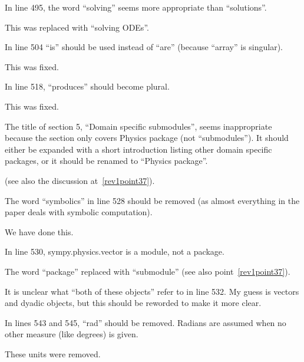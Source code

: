 \documentclass[answers,12pt]{exam}
\begin{document}
\begin{questions}
\question In line 495, the word ``solving'' seems more appropriate than ``solutions''.
\begin{solution}
This was replaced with ``solving ODEs''.
\end{solution}

\question In line 504 ``is'' should be used instead of ``are'' (because ``array'' is singular).
\begin{solution}
This was fixed.
\end{solution}

\question In line 518, ``produces'' should become plural.
\begin{solution}
This was fixed.
\end{solution}

\question The title of section 5, ``Domain specific submodules'', seems inappropriate because the section only covers Physics package (not ``submodules''). It should either be expanded with a short introduction listing other domain specific packages, or it should be renamed to ``Physics package''.
\begin{solution}
(see also the discussion at~\ref{rev1point37}).
\end{solution}

\question The word ``symbolics'' in line 528 should be removed (as almost everything in the paper deals with symbolic computation).
\begin{solution}
We have done this.
\end{solution}

\question In line 530, sympy.physics.vector is a module, not a package.
\begin{solution}
The word ``package'' replaced with ``submodule'' (see also point~\ref{rev1point37}).
\end{solution}

\question It is unclear what ``both of these objects'' refer to in line 532. My guess is vectors and dyadic objects, but this should be reworded to make it more clear.
\begin{solution}

\end{solution}

\question In lines 543 and 545, ``rad'' should be removed. Radians are assumed when no other measure (like degrees) is given.
\begin{solution}
These units were removed.
\end{solution}


\end{questions}
\end{document}
